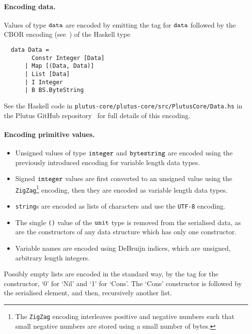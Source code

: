 
\paragraph{Encoding data.}
Values of type $\mathtt{data}$ are encoded by emitting the tag for $\mathtt{data}$ followed
by the CBOR encoding (see~\cite{rfc8949}) of the Haskell type
\begin{verbatim}
  data Data =
        Constr Integer [Data]
      | Map [(Data, Data)]
      | List [Data]
      | I Integer
      | B BS.ByteString
\end{verbatim}
\noindent
See the Haskell code in \texttt{plutus-core/plutus-core/src/PlutusCore/Data.hs}
in the Plutus GitHub repository~\cite{plutus-repo} for full details of this encoding. 


\paragraph{Encoding primitive values.}
\begin{itemize}
  \item Unsigned values of type $\mathtt{integer}$ and $\mathtt{bytestring}$ are encoded using the
    previously introduced encoding for variable length data types.
  \item Signed $\mathtt{integer}$ values are first converted to an unsigned value
    using the \texttt{ZigZag}\footnote{The \texttt{ZigZag} encoding interleaves
      positive and negative numbers such that small negative numbers are stored
      using a small number of bytes.} encoding, then they are encoded as
    variable length data types.
  \item \texttt{string}s are encoded as lists of characters and use the \texttt{UTF-8}
    encoding.
  \item The single \texttt{()} value of the $\mathtt{unit}$ type is removed from the
    serialised data, as are the constructors of any data structure which has only one constructor.
  \item Variable names are encoded using DeBruijn indices, which are unsigned, arbitrary
    length integers.
\end{itemize}

Possibly empty lists are encoded in the standard way, by the tag for the constructor,
`0' for `Nil' and `1' for `Cons'. The `Cons' constructor is followed by the serialised
element, and then, recursively another list.

